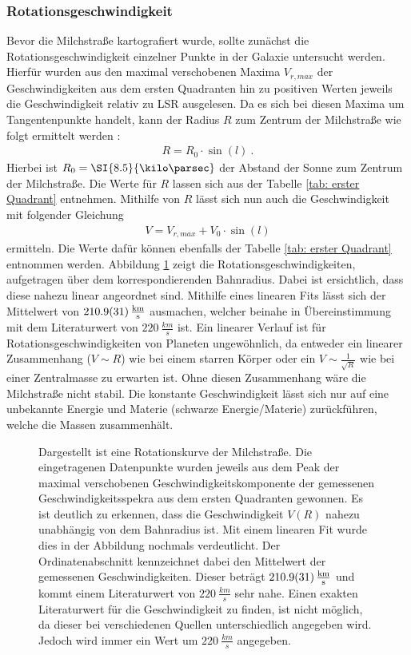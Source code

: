 \subsubsection{Rotationsgeschwindigkeit}
Bevor die Milchstraße kartografiert wurde, sollte zunächst die Rotationsgeschwindigkeit einzelner Punkte in der Galaxie untersucht werden. Hierfür wurden aus den maximal verschobenen Maxima $V_{r,max}$ der Geschwindigkeiten aus dem ersten Quadranten hin zu positiven Werten jeweils die Geschwindigkeit relativ zu LSR ausgelesen. Da es sich bei diesen Maxima um Tangentenpunkte handelt, kann der Radius $R$ zum Zentrum der Milchstraße wie folgt ermittelt werden \cite{H1}:
\begin{align}
    R = R_0 \cdot \sin(l) \ .
    \label{eq:TangenteR}
\end{align}
Hierbei ist $R_0 = \SI{8.5}{\kilo \parsec}$ der Abstand der Sonne zum Zentrum der Milchstraße. Die Werte für $R$ lassen sich aus der Tabelle \ref{tab: erster Quadrant} entnehmen. Mithilfe von $R$ lässt sich nun auch die Geschwindigkeit mit folgender Gleichung \cite{H1}
\begin{align}
    V = V_{r,max} + V_0 \cdot \sin(l)
    \label{eq:V(R)}
\end{align}
ermitteln. Die Werte dafür können ebenfalls der Tabelle \ref{tab: erster Quadrant} entnommen werden. Abbildung \ref{fig:VvonR} zeigt die Rotationsgeschwindigkeiten, aufgetragen über dem korrespondierenden Bahnradius. Dabei ist ersichtlich, dass diese nahezu linear angeordnet sind. Mithilfe eines linearen Fits lässt sich der Mittelwert von $\SI{210.9 \pm 3.1}{\frac{km}{s}}$ ausmachen, welcher beinahe in Übereinstimmung mit dem Literaturwert von $\SI{220}{\frac{km}{s}}$ \cite{LSR} ist. Ein linearer Verlauf ist für Rotationsgeschwindigkeiten von Planeten ungewöhnlich, da entweder ein linearer Zusammenhang ($V \sim R$) wie bei einem starren Körper oder ein $V \sim\frac{1}{\sqrt{R}}$ wie bei einer Zentralmasse zu erwarten ist. Ohne diesen Zusammenhang wäre die Milchstraße nicht stabil. Die konstante Geschwindigkeit lässt sich nur auf eine unbekannte Energie und Materie (schwarze  Energie/Materie) zurückführen, welche die Massen zusammenhält.
\begin{figure}[H]
    \centering
    
    \caption[Rotationskurve der Milchstraße]{Dargestellt ist eine Rotationskurve der Milchstraße. Die eingetragenen Datenpunkte wurden jeweils aus dem Peak der maximal verschobenen Geschwindigkeitskomponente der gemessenen Geschwindigkeitsspekra aus dem ersten Quadranten gewonnen. Es ist deutlich zu erkennen, dass die Geschwindigkeit $V(R)$ nahezu unabhängig von dem Bahnradius ist. Mit einem linearen Fit wurde dies in der Abbildung nochmals verdeutlicht. Der Ordinatenabschnitt kennzeichnet dabei den Mittelwert der gemessenen Geschwindigkeiten. Dieser beträgt $\SI{210.9 \pm 3.1}{\frac{km}{s}}$ und kommt einem Literaturwert von $\SI{220}{\frac{km}{s}}$ \cite{LSR} sehr nahe. Einen exakten Literaturwert für die Geschwindigkeit zu finden, ist nicht möglich, da dieser bei verschiedenen Quellen unterschiedlich angegeben wird. Jedoch wird immer ein Wert um $\SI{220}{\frac{km}{s}}$ angegeben.}
    \label{fig:VvonR}
\end{figure}
